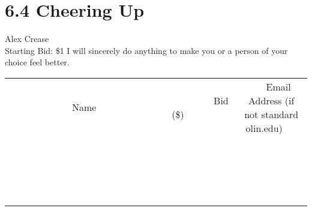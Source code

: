 \documentclass[11pt]{article}
\begin{document}
\section*{6.4 Cheering Up}
Alex Crease
\\
Starting Bid: \$1
\newline
I will sincerely do anything to make you or a person of your choice feel better.
\\[3ex]
\begin{tabular}{c c c}
~~~~~~~~~~~~~Name~~~~~~~~~~~~~ & ~~~~~~~~~Bid (\$)~~~~~~~~~  & ~~~Email Address (if not standard olin.edu)~~~\\
 & & \\
\hline
 & & \\
\hline
 & & \\
\hline
 & & \\
\hline
 & & \\
\hline
 & & \\
\hline
 & & \\
\hline
 & & \\
\hline
 & & \\
\hline
 & & \\
\hline
 & & \\
\hline
 & & \\
\hline
 & & \\
\hline
 & & \\
\hline
 & & \\
\hline
 & & \\
\hline
 & & \\
\hline
 & & \\
\hline
 & & \\
\hline
\end{tabular}
\newpage
\end{document}
